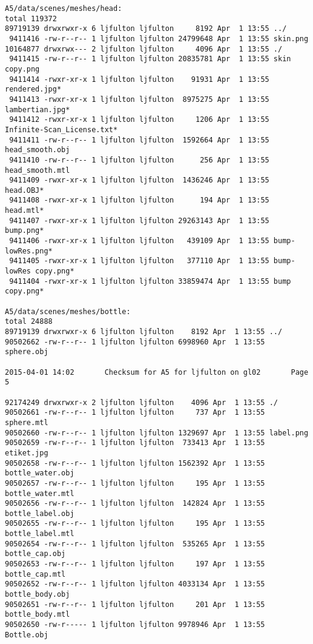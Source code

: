 \documentclass[12pt]{article}
\begin{document}
\begin{verbatim}
A5/data/scenes/meshes/head:
total 119372
89719139 drwxrwxr-x 6 ljfulton ljfulton     8192 Apr  1 13:55 ../
 9411416 -rw-r--r-- 1 ljfulton ljfulton 24799648 Apr  1 13:55 skin.png
10164877 drwxrwx--- 2 ljfulton ljfulton     4096 Apr  1 13:55 ./
 9411415 -rw-r--r-- 1 ljfulton ljfulton 20835781 Apr  1 13:55 skin copy.png
 9411414 -rwxr-xr-x 1 ljfulton ljfulton    91931 Apr  1 13:55 rendered.jpg*
 9411413 -rwxr-xr-x 1 ljfulton ljfulton  8975275 Apr  1 13:55 lambertian.jpg*
 9411412 -rwxr-xr-x 1 ljfulton ljfulton     1206 Apr  1 13:55 Infinite-Scan_License.txt*
 9411411 -rw-r--r-- 1 ljfulton ljfulton  1592664 Apr  1 13:55 head_smooth.obj
 9411410 -rw-r--r-- 1 ljfulton ljfulton      256 Apr  1 13:55 head_smooth.mtl
 9411409 -rwxr-xr-x 1 ljfulton ljfulton  1436246 Apr  1 13:55 head.OBJ*
 9411408 -rwxr-xr-x 1 ljfulton ljfulton      194 Apr  1 13:55 head.mtl*
 9411407 -rwxr-xr-x 1 ljfulton ljfulton 29263143 Apr  1 13:55 bump.png*
 9411406 -rwxr-xr-x 1 ljfulton ljfulton   439109 Apr  1 13:55 bump-lowRes.png*
 9411405 -rwxr-xr-x 1 ljfulton ljfulton   377110 Apr  1 13:55 bump-lowRes copy.png*
 9411404 -rwxr-xr-x 1 ljfulton ljfulton 33859474 Apr  1 13:55 bump copy.png*

A5/data/scenes/meshes/bottle:
total 24888
89719139 drwxrwxr-x 6 ljfulton ljfulton    8192 Apr  1 13:55 ../
90502662 -rw-r--r-- 1 ljfulton ljfulton 6998960 Apr  1 13:55 sphere.obj

2015-04-01 14:02       Checksum for A5 for ljfulton on gl02       Page 5

92174249 drwxrwxr-x 2 ljfulton ljfulton    4096 Apr  1 13:55 ./
90502661 -rw-r--r-- 1 ljfulton ljfulton     737 Apr  1 13:55 sphere.mtl
90502660 -rw-r--r-- 1 ljfulton ljfulton 1329697 Apr  1 13:55 label.png
90502659 -rw-r--r-- 1 ljfulton ljfulton  733413 Apr  1 13:55 etiket.jpg
90502658 -rw-r--r-- 1 ljfulton ljfulton 1562392 Apr  1 13:55 bottle_water.obj
90502657 -rw-r--r-- 1 ljfulton ljfulton     195 Apr  1 13:55 bottle_water.mtl
90502656 -rw-r--r-- 1 ljfulton ljfulton  142824 Apr  1 13:55 bottle_label.obj
90502655 -rw-r--r-- 1 ljfulton ljfulton     195 Apr  1 13:55 bottle_label.mtl
90502654 -rw-r--r-- 1 ljfulton ljfulton  535265 Apr  1 13:55 bottle_cap.obj
90502653 -rw-r--r-- 1 ljfulton ljfulton     197 Apr  1 13:55 bottle_cap.mtl
90502652 -rw-r--r-- 1 ljfulton ljfulton 4033134 Apr  1 13:55 bottle_body.obj
90502651 -rw-r--r-- 1 ljfulton ljfulton     201 Apr  1 13:55 bottle_body.mtl
90502650 -rw-r----- 1 ljfulton ljfulton 9978946 Apr  1 13:55 Bottle.obj


\end{verbatim}
\end{document}
